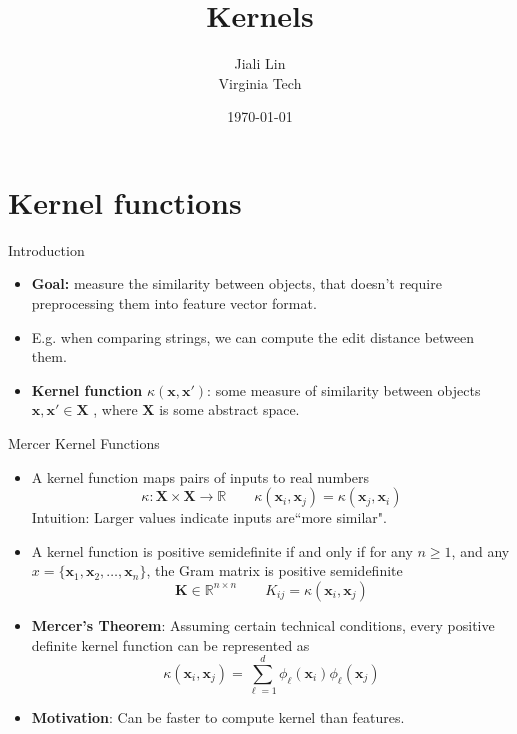 \documentclass[10pt,mathserif]{beamer}
\title{\large \bfseries Kernels}
\author{Jiali Lin\\[3ex]
Virginia Tech}
\date{\today}
\begin{document}
\frame{
\thispagestyle{empty}
\titlepage
}

\section{Kernel functions}
\begin{frame}{Introduction}
\begin{itemize}
    \item \textbf{Goal:} measure the similarity between objects, that doesn't require preprocessing them into feature vector format.
    \item E.g. when comparing strings, we can compute the edit distance between them.
    \item \textbf{Kernel function} $\kappa (\bm{x}, \bm{x'})$: some measure of similarity between objects $\bm{x}, \bm{x'}\in\mathcal{\bm{X}}$ , where $\mathcal{\bm{X}}$ is some abstract space.
\end{itemize}
\end{frame}

\begin{frame}{Mercer Kernel Functions}
\begin{itemize}
    \item A kernel function maps pairs of inputs to real numbers
    \begin{equation*}
        \kappa: \mathcal{\bm{X}} \times \mathcal{\bm{X}} \rightarrow \mathbb{R} \quad\quad \kappa (\bm{x}_i, \bm{x}_j) = \kappa(\bm{x}_j, \bm{x}_i)
    \end{equation*}
    Intuition: Larger values indicate inputs are``more similar".
    \item A kernel function is positive semidefinite if and only if for any $n\geq1$, and any $x = \{\bm{x}_1, \bm{x}_2,\ldots,\bm{x}_n\}$, the Gram matrix is positive semidefinite
    \begin{equation*}
        \bm{K} \in \mathbb{R}^{n \times n}\quad\quad K_{ij} = \kappa (\bm{x}_i, \bm{x}_j)
    \end{equation*}
    \item \textbf{Mercer's Theorem}: Assuming certain technical conditions, every positive definite kernel function can be represented as
    \begin{equation*}
        \kappa (\bm{x}_i, \bm{x}_j) = \sum_{\ell=1}^d\phi_\ell(\bm{x}_i)\phi_\ell(\bm{x}_j)
    \end{equation*}
    \item \textbf{Motivation}: Can be faster to compute kernel than features.
\end{itemize}
\end{frame}
\end{document}
